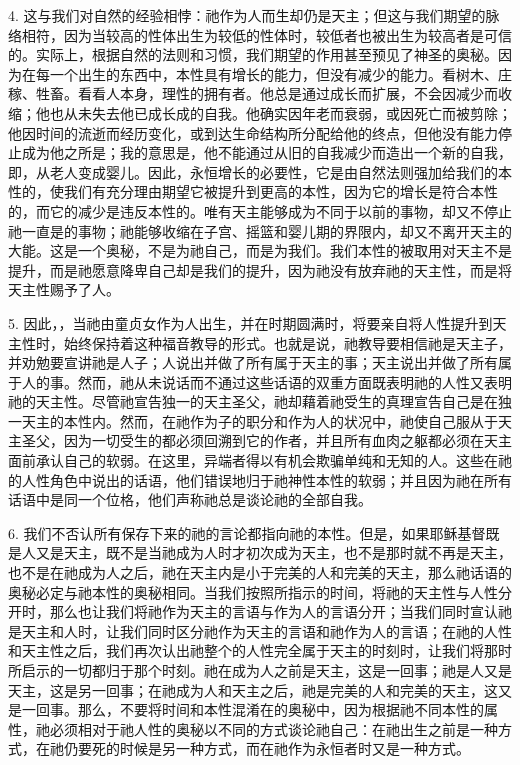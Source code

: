 4. 这与我们对自然的经验相悖：祂作为人而生却仍是天主；但这与我们期望的脉络相符，因为当较高的性体出生为较低的性体时，较低者也被出生为较高者是可信的。实际上，根据自然的法则和习惯，我们期望的作用甚至预见了神圣的奥秘。因为在每一个出生的东西中，本性具有增长的能力，但没有减少的能力。看树木、庄稼、牲畜。看看人本身，理性的拥有者。他总是通过成长而扩展，不会因减少而收缩；他也从未失去他已成长成的自我。他确实因年老而衰弱，或因死亡而被剪除；他因时间的流逝而经历变化，或到达生命结构所分配给他的终点，但他没有能力停止成为他之所是；我的意思是，他不能通过从旧的自我减少而造出一个新的自我，即，从老人变成婴儿。因此，永恒增长的必要性，它是由自然法则强加给我们的本性的，使我们有充分理由期望它被提升到更高的本性，因为它的增长是符合本性的，而它的减少是违反本性的。唯有天主能够成为不同于以前的事物，却又不停止祂一直是的事物；祂能够收缩在子宫、摇篮和婴儿期的界限内，却又不离开天主的大能。这是一个奥秘，不是为祂自己，而是为我们。我们本性的被取用对天主不是提升，而是祂愿意降卑自己却是我们的提升，因为祂没有放弃祂的天主性，而是将天主性赐予了人。\par

5. 因此，，当祂由童贞女作为人出生，并在时期圆满时，将要亲自将人性提升到天主性时，始终保持着这种福音教导的形式。也就是说，祂教导要相信祂是天主子，并劝勉要宣讲祂是人子；人说出并做了所有属于天主的事；天主说出并做了所有属于人的事。然而，祂从未说话而不通过这些话语的双重方面既表明祂的人性又表明祂的天主性。尽管祂宣告独一的天主圣父，祂却藉着祂受生的真理宣告自己是在独一天主的本性内。然而，在祂作为子的职分和作为人的状况中，祂使自己服从于天主圣父，因为一切受生的都必须回溯到它的作者，并且所有血肉之躯都必须在天主面前承认自己的软弱。在这里，异端者得以有机会欺骗单纯和无知的人。这些在祂的人性角色中说出的话语，他们错误地归于祂神性本性的软弱；并且因为祂在所有话语中是同一个位格，他们声称祂总是谈论祂的全部自我。\par

6. 我们不否认所有保存下来的祂的言论都指向祂的本性。但是，如果耶稣基督既是人又是天主，既不是当祂成为人时才初次成为天主，也不是那时就不再是天主，也不是在祂成为人之后，祂在天主内是小于完美的人和完美的天主，那么祂话语的奥秘必定与祂本性的奥秘相同。当我们按照所指示的时间，将祂的天主性与人性分开时，那么也让我们将祂作为天主的言语与作为人的言语分开；当我们同时宣认祂是天主和人时，让我们同时区分祂作为天主的言语和祂作为人的言语；在祂的人性和天主性之后，我们再次认出祂整个的人性完全属于天主的时刻时，让我们将那时所启示的一切都归于那个时刻。祂在成为人之前是天主，这是一回事；祂是人又是天主，这是另一回事；在祂成为人和天主之后，祂是完美的人和完美的天主，这又是一回事。那么，不要将时间和本性混淆在的奥秘中，因为根据祂不同本性的属性，祂必须相对于祂人性的奥秘以不同的方式谈论祂自己：在祂出生之前是一种方式，在祂仍要死的时候是另一种方式，而在祂作为永恒者时又是一种方式。\par

